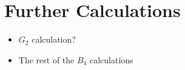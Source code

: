 
\chapter{Further Calculations}
\label{AppendixA}

\begin{itemize}
\item $G_2$ calculation?
\item The rest of the $B_4$ calculations
\end{itemize}